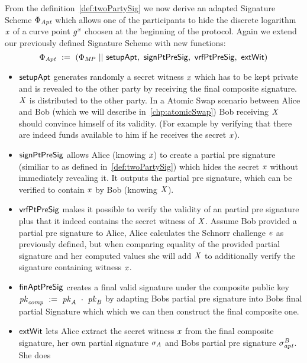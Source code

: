 \begin{definition}
    \label{def:twoPartyFixedWitAptSig}
    From the definition~\ref{def:twoPartySig} we now derive an adapted Signature Scheme $\Phi_{\mathit{Apt}}$ which allows one of the participants to hide the discrete logarithm $\mathit{x}$ of a curve point $\mathit{g}^{\mathit{x}}$ choosen
    at the beginning of the protocol. Again we extend our previously defined Signature Scheme with new functions:
    \[ \Phi_{\mathit{Apt}} ~:=~ (\Phi_{\mathit{MP}} ~||~ \mathsf{setupApt} ,~ \mathsf{signPtPreSig} ,~ \mathsf{vrfPtPreSig} ,~ \mathsf{extWit}) \]
    \begin{itemize}
        \item $\mathsf{setupApt}$ generates randomly a secret witness $\mathit{x}$ which has to be kept private and is revealed to the other party by receiving the final composite signature. $\mathit{X}$ is distributed
        to the other party. In a Atomic Swap scenario between Alice and Bob (which we will describe in~\ref{chp:atomicSwap}) Bob receiving $\mathit{X}$ should convince himself of its validity. (For example by verifying that
        there are indeed funds available to him if he receives the secret $\mathit{x}$).
        \item $\mathsf{signPtPreSig}$ allows Alice (knowing $\mathit{x}$) to create a partial pre signature (similiar to as defined in~\ref{def:twoPartySig}) which hides the secret $\mathit{x}$ without immediately revealing it.
        It outputs the partial pre signature, which can be verified to contain $\mathit{x}$ by Bob (knowing $\mathit{X}$).
        \item $\mathsf{vrfPtPreSig}$ makes it possible to verify the validity of an partial pre signature plus that it indeed contains the secret witness of $\mathit{X}$. Assume Bob provided a partial pre signature to Alice,
        Alice calculates the Schnorr challenge $\mathit{e}$ as previously defined, but when comparing equality of the provided partial signature and her computed values she will add $\mathit{X}$ to additionally
        verify the signature containing witness $\mathit{x}$.
        \item $\mathsf{finAptPreSig}$ creates a final valid signature under the composite public key $\mathit{pk}_{\mathit{comp}} ~:=~ \mathit{pk}_{\mathit{A}} ~\cdot~ \mathit{pk}_{\mathit{B}}$ by adapting Bobs partial pre signature
        into Bobs final partial Signature which which we can then construct the final composite one.
        \item $\mathsf{extWit}$ lets Alice extract the secret witness $\mathit{x}$ from the final composite signature, her own partial signature $\sigma_{\mathit{A}}$ and Bobs partial pre signature $\sigma^{\mathit{B}}_{\mathit{apt}}$. She does

\end{itemize}
\end{definition}
